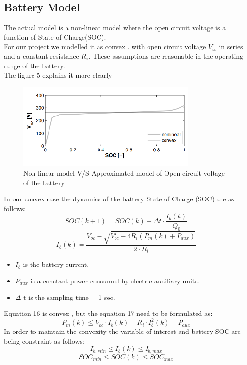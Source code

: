 \documentclass[conference]{IEEEtran}
\begin{document}
\subsection{Battery Model}
The actual model is a non-linear model where the open circuit voltage is a function of State of Charge(SOC).\\
For our project we modelled it as convex , with open circuit voltage $V_{oc}$ in series and a constant resistance $R_i$. These assumptions are reasonable in the operating range of the battery.\\
The figure 5 explains it more clearly\\
\begin{figure}[h]
\includegraphics[width=9cm]{Voltage model .png}
\caption{Non linear model V/S Approximated model of Open circuit voltage of the battery}
\end{figure}
In our convex case the dynamics of the battery State of Charge (SOC) are as follows:\\
\begin{equation}\label{eq1}
   SOC(k + 1) = SOC(k) - \Delta t \cdot \frac{I_b(k)}{Q_0}
\end{equation}
\begin{equation}\label{eq1}
   I_b(k) = \frac{V_{oc} −\sqrt{V_{oc}^2- 4 R_i(P_m(k)+P_{aux})}}{2 \cdot R_i} 
\end{equation}
\begin{itemize}
    \item $I_b$ is the battery current.
    \item $P_{aux}$ is a constant power consumed by electric auxiliary units.
    \item $\Delta$ t is the sampling time = 1 sec.
\end{itemize}
Equation 16 is convex , but the equation 17 need to be formulated as:\\
\begin{equation}\label{eq1}
  P_m(k) \leq V_{oc} \cdot I_b(k) − R_i \cdot I^2_b(k) − P_{aux} 
\end{equation}
In order to maintain the convexity the variable of interest and battery SOC are being constraint as follows:
\begin{equation}\label{eq1}
  I_{b,min} \leq I_b(k) \leq I_{b,max} 
\end{equation}
\begin{equation}\label{eq1}
  SOC_{min} \leq SOC(k) \leq SOC_{max} 
\end{equation}
\end{document}
